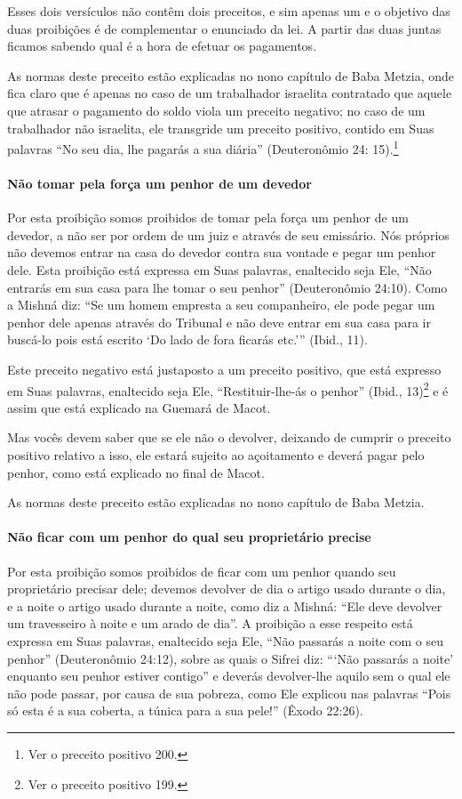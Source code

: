 Esses dois versículos não contêm dois preceitos, e sim apenas um e o
objetivo das duas proibições é de complementar o enunciado da lei. A
partir das duas juntas ficamos sabendo qual é a hora de efetuar os
pagamentos.

As normas deste preceito estão explicadas no nono capítulo de Baba
Metzia, onde fica claro que é apenas no caso de um trabalhador israelita
contratado que aquele que atrasar o pagamento do soldo viola um
preceito negativo; no caso de um trabalhador não israelita, ele
transgride um preceito positivo, contido em Suas palavras ``No seu dia,
lhe pagarás a sua diária'' (Deuteronômio 24: 15).\footnote{Ver o preceito positivo 200.}

\paragraph{Não tomar pela força um penhor de um devedor}

Por esta proibição somos proibidos de tomar pela força um penhor de um
devedor, a não ser por ordem de um juiz e através de seu emissário. Nós
próprios não devemos entrar na casa do devedor contra sua vontade e
pegar um penhor dele. Esta proibição está expressa em Suas palavras,
enaltecido seja Ele, ``Não entrarás em sua casa para lhe tomar o seu
penhor'' (Deuteronômio 24:10). Como a Mishná diz: ``Se um homem
empresta a seu companheiro, ele pode pegar um penhor dele apenas através
do Tribunal e não deve entrar em sua casa para ir buscá-lo pois está
escrito `Do lado de fora ficarás etc.''' (Ibid., 11).

Este preceito negativo está justaposto a um preceito positivo, que está
expresso em Suas palavras, enaltecido seja Ele, ``Restituir-lhe-ás o
penhor'' (Ibid., 13)\footnote{Ver o preceito positivo 199.} e é assim que está explicado
na Guemará de Macot.

Mas vocês devem saber que se ele não o devolver, deixando de cumprir o
preceito positivo relativo a isso, ele estará sujeito ao açoitamento e
deverá pagar pelo penhor, como está explicado no final de Macot.

As normas deste preceito estão explicadas no nono capítulo de Baba Metzia.

\paragraph{Não ficar com um penhor do qual seu proprietário precise}

Por esta proibição somos proibidos de ficar com um penhor quando seu
proprietário precisar dele; devemos devolver de dia o artigo usado
durante o dia, e a noite o artigo usado durante a noite, como diz a
Mishná: ``Ele deve devolver um travesseiro à noite e um arado de dia''.
A proibição a esse respeito está expressa em Suas palavras, enaltecido
seja Ele, ``Não passarás a noite com o seu penhor'' (Deuteronômio
24:12), sobre as quais o Sifrei diz: ```Não passarás a noite' enquanto
seu penhor estiver contigo'' e deverás devolver-lhe aquilo sem o qual
ele não pode passar, por causa de sua pobreza, como Ele explicou nas
palavras ``Pois só esta é a sua coberta, a túnica para a sua pele!''
(Êxodo 22:26).

